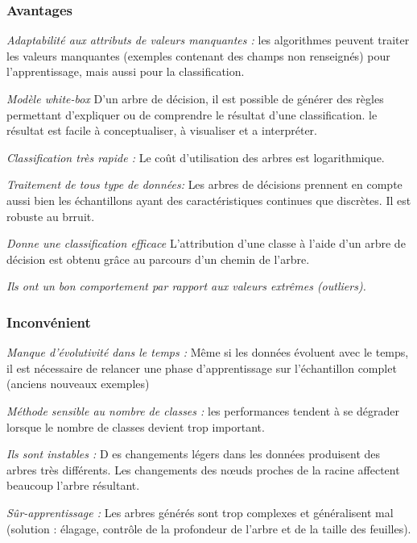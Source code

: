 \subsubsection{Avantages}
\begin{description}
   \item{\textit{Adaptabilité aux attributs de valeurs manquantes :}} les
    algorithmes peuvent traiter les valeurs manquantes (exemples contenant
    des champs non renseignés) pour l'apprentissage, mais aussi pour la 
    classification.
  \item{\textit{Modèle white-box }} D'un arbre de décision, il
    est possible de générer des règles permettant d'expliquer ou de comprendre le
    résultat d'une classification. le résultat est facile à conceptualiser, 
    à visualiser et a interpréter.
  \item{\textit{Classification très rapide :}} Le coût d'utilisation des arbres est
    logarithmique.
  \item{\textit{Traitement de tous type de données: }} Les arbres de décisions
    prennent en compte aussi bien les échantillons ayant des caractéristiques
    continues que discrètes. Il est robuste au brruit.
  \item{\textit{Donne une classification efficace}} L'attribution d'une classe à
    l'aide d'un arbre de décision est obtenu grâce au parcours d'un chemin de
    l'arbre.
  \item{\textit{Ils ont un bon comportement par rapport aux valeurs extrêmes
    (outliers).}}
\end{description}

\subsubsection{Inconvénient}
  \begin{description}
     \item{\textit{Manque d’évolutivité dans le temps :}} Même si les données
      évoluent avec le temps, il est nécessaire de relancer une phase d'apprentissage 
      sur l'échantillon complet (anciens nouveaux exemples)
     \item{\textit{Méthode sensible au nombre de classes :}} les performances tendent à
      se dégrader lorsque le nombre de classes devient trop important.
    \item{\textit{Ils sont instables :}} D es changements légers dans les données produisent des 
      arbres très différents. Les changements des nœuds proches de la racine affectent 
      beaucoup l’arbre résultant. 
    \item{\textit{Sûr-apprentissage :}} Les arbres générés sont trop complexes et généralisent 
      mal (solution : élagage, contrôle de la profondeur de l’arbre et de la taille 
      des feuilles).
  \end{description}


